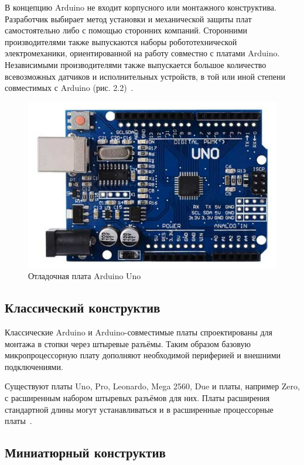 \documentclass[12pt, oneside]{altsu-report}
\begin{document}
В концепцию Arduino не входит корпусного или монтажного конструктива. Разработчик выбирает метод установки и механической защиты плат самостоятельно либо с помощью сторонних компаний. Сторонними производителями также выпускаются наборы робототехнической электромеханики, ориентированной на работу совместно с платами Arduino. Независимыми производителями также выпускается большое количество всевозможных датчиков и исполнительных устройств, в той или иной степени совместимых с Arduino (рис. 2.2)~\cite{UNO}.

\begin{figure}[!ht]
    \centering
    \includegraphics{Arduino_Uno.png}
    \caption{Отладочная плата Arduino Uno}
    \label{fig:uno}
\end{figure}

\subsection{Классический конструктив}

Классические Arduino и Arduino-совместимые платы спроектированы для монтажа в стопки через штыревые разъёмы. Таким образом базовую микропроцессорную плату дополняют необходимой периферией и внешними подключениями.

Существуют платы Uno, Pro, Leonardo, Mega 2560, Due и платы, например Zero, с расширенным набором штыревых разъёмов для них. Платы расширения стандартной длины могут устанавливаться и в расширенные процессорные платы~\cite{Arduino}.

\subsection{Миниатюрный конструктив}
\end{document}
